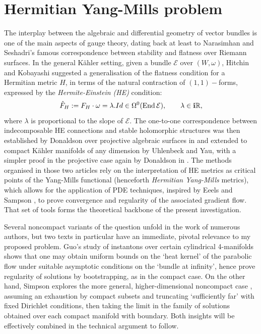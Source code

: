 \documentclass{article}
\newcommand{\func}[1]{\textnormal {#1\,}}
\newcommand{\R}{\mathbb{R}}
\newcommand{\mc}[1]{\mathcal{#1}}
\begin{document}
\newpage
\section{Hermitian Yang-Mills problem}
\label{sec HYM}

The interplay between the algebraic and differential geometry of vector bundles is one of the main aspects of  gauge theory, dating back at least to Narasimhan and Seshadri's famous correspondence between stability and flatness over Riemann surfaces.    In the general K\"ahler setting, given a bundle $\mc{E}$ over $(W,\omega)$, Hitchin and Kobayashi suggested a generalisation of the flatness condition for a Hermitian metric $H$, in terms of the natural contraction of $(1,1)-$forms, expressed by the \emph{Hermite-Einstein (HE)} condition:
$$
\hat{F}_{H}:=F_H\cdot \omega =\lambda.Id\in\Omega^0(\func{End}\mc{E}),
\qquad\lambda\in \mathbf{i}\R,
$$
where $\lambda$ is proportional to the slope of $\mc{E}$. The one-to-one correspondence between indecomposable HE connections and stable holomorphic structures was then established by Donaldson  over projective algebraic surfaces in \cite{ASDYM} and extended to compact K\"ahler manifolds of any dimension by Uhlenbeck and Yau, with a simpler proof in the projective case again by Donaldson in \cite{inf dets stab bdls...}.  The methods organised in those two articles rely on the interpretation of HE metrics as critical points of the Yang-Mills functional (henceforth \emph{Hermitian Yang-Mills} metrics), which allows for the application of PDE techniques, inspired by Eeels and Sampson \cite{Eels and Sampson}, to prove convergence and regularity of the associated gradient flow. That set of tools forms the theoretical backbone of the present investigation.

Several noncompact variants of the question unfold in the work of numerous authors, but two texts in particular have an immediate, pivotal relevance to my proposed  problem. Guo's study of instantons over certain cylindrical 4-manifolds \cite{Guo} shows that one may obtain uniform bounds on the `heat kernel' of the parabolic flow under suitable asymptotic conditions on the `bundle at infinity', hence prove regularity of solutions by bootstrapping, as in the compact case. On the other hand, Simpson explores the more general, higher-dimensional noncompact case    \cite{Simpson}, assuming an exhaustion by compact subsets and truncating `sufficiently far' with fixed Dirichlet conditions, then taking the limit in the family of solutions obtained over each compact manifold with boundary.
Both insights will be effectively combined in the technical argument to follow.
\end{document}
